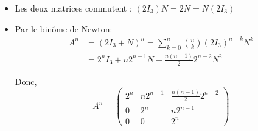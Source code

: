 \documentclass[10pt,a4paper]{article}
\begin{document}
\begin{enumerate}
\begin{itemize}
        \item Les deux matrices commutent : $(2I_3)N = 2N = N(2I_3)$

        \item Par le binôme de Newton:
        \begin{align*}
        A^n &= (2I_3 + N)^n = \sum_{k=0}^n \binom{n}{k} (2I_3)^{n-k} N^k \\
        &= 2^n I_3 + n 2^{n-1} N + \frac{n(n-1)}{2} 2^{n-2} N^2
        \end{align*}

        Donc,
        $$
        A^n = \begin{pmatrix}
        2^n & n 2^{n-1} & \frac{n(n-1)}{2} 2^{n-2} \\
        0 & 2^n & n 2^{n-1} \\
        0 & 0 & 2^n
        \end{pmatrix}
        $$
    \end{itemize}
\end{enumerate}
\end{document}
